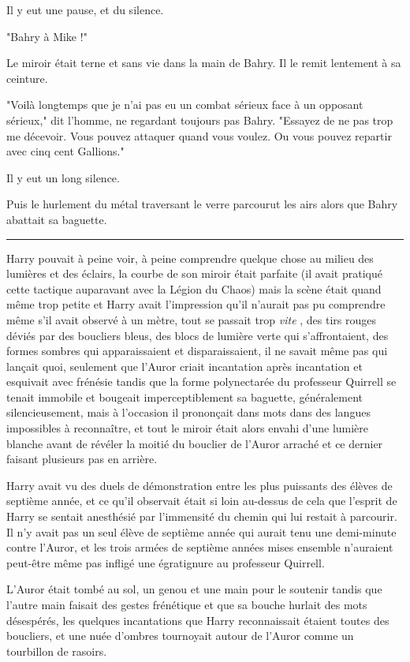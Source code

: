 Il y eut une pause, et du silence.

"Bahry à Mike !"

Le miroir était terne et sans vie dans la main de Bahry. Il le remit lentement à sa ceinture.

"Voilà longtemps que je n'ai pas eu un combat sérieux face à un opposant sérieux," dit l'homme, ne regardant toujours pas Bahry. "Essayez de ne pas trop me décevoir. Vous pouvez attaquer quand vous voulez. Ou vous pouvez repartir avec cinq cent Gallions."

Il y eut un long silence.

Puis le hurlement du métal traversant le verre parcourut les airs alors que Bahry abattait sa baguette.
\par\noindent\rule{\textwidth}{0.4pt}
Harry pouvait à peine voir, à peine comprendre quelque chose au milieu des lumières et des éclairs, la courbe de son miroir était parfaite (il avait pratiqué cette tactique auparavant avec la Légion du Chaos) mais la scène était quand même trop petite et Harry avait l'impression qu'il n'aurait pas pu comprendre même s'il avait observé à un mètre, tout se passait trop \emph{vite} , des tirs rouges déviés par des boucliers bleus, des blocs de lumière verte qui s'affrontaient, des formes sombres qui apparaissaient et disparaissaient, il ne savait même pas qui lançait quoi, seulement que l'Auror criait incantation après incantation et esquivait avec frénésie tandis que la forme polynectarée du professeur Quirrell se tenait immobile et bougeait imperceptiblement sa baguette, généralement silencieusement, mais à l'occasion il prononçait dans mots dans des langues impossibles à reconnaître, et tout le miroir était alors envahi d'une lumière blanche avant de révéler la moitié du bouclier de l'Auror arraché et ce dernier faisant plusieurs pas en arrière.

Harry avait vu des duels de démonstration entre les plus puissants des élèves de septième année, et ce qu'il observait était si loin au-dessus de cela que l'esprit de Harry se sentait anesthésié par l'immensité du chemin qui lui restait à parcourir. Il n'y avait pas un seul élève de septième année qui aurait tenu une demi-minute contre l'Auror, et les trois armées de septième années mises ensemble n'auraient peut-être même pas infligé une égratignure au professeur Quirrell.

L'Auror était tombé au sol, un genou et une main pour le soutenir tandis que l'autre main faisait des gestes frénétique et que sa bouche hurlait des mots désespérés, les quelques incantations que Harry reconnaissait étaient toutes des boucliers, et une nuée d'ombres tournoyait autour de l'Auror comme un tourbillon de rasoirs.

